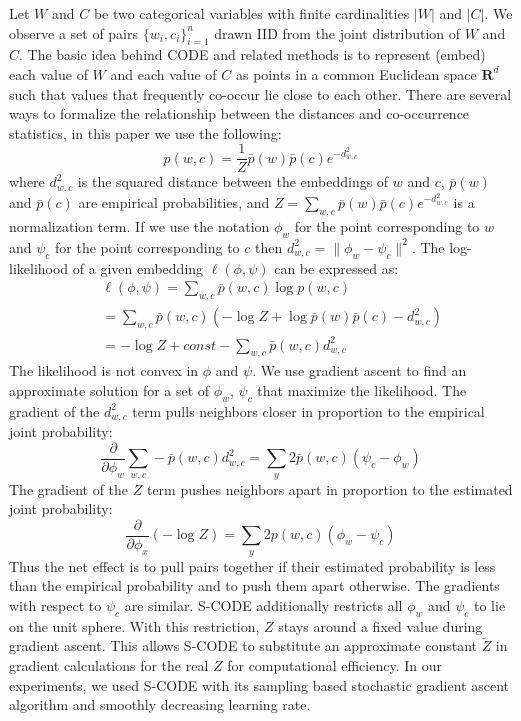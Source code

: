 Let $W$ and $C$ be two categorical variables with finite cardinalities
$|W|$ and $|C|$.  We observe a set of pairs $\{w_i, c_i\}_{i=1}^n$
drawn IID from the joint distribution of $W$ and $C$.  The basic idea
behind CODE and related methods is to represent (embed) each value of
$W$ and each value of $C$ as points in a common Euclidean space
$\mathbf{R}^d$ such that values that frequently co-occur lie close to
each other.  There are several ways to formalize the relationship
between the distances and co-occurrence statistics, in this paper we
use the following:
\begin{equation} \label{eq:probability}
p(w,c) = \frac{1}{Z} \bar{p}(w) \bar{p}(c) e^{-d^2_{w,c}}
\end{equation}
\noindent where $d^2_{w,c}$ is the squared distance between the
embeddings of $w$ and $c$, $\bar{p}(w)$ and $\bar{p}(c)$ are empirical
probabilities, and $Z=\sum_{w,c} \bar{p}(w) \bar{p}(c) e^{-d^2_{w,c}}$
is a normalization term.  If we use the notation $\phi_w$ for the
point corresponding to $w$ and $\psi_c$ for the point corresponding to
$c$ then $d^2_{w,c} = \|\phi_w-\psi_c\|^2$.  The log-likelihood of a
given embedding $\ell(\phi, \psi)$ can be expressed as:
\begin{eqnarray}
&&\ell(\phi, \psi) = \sum_{w,c} \bar{p}(w,c) \log p(w,c) \label{eq:likelihood} \\
&&= \sum_{w,c} \bar{p}(w,c) (-\log Z + \log \bar{p}(w)\bar{p}(c) - d^2_{w,c}) \nonumber \\
&&= -\log Z + \mathit{const} - \sum_{w,c} \bar{p}(w,c) d^2_{w,c} \nonumber
\end{eqnarray}
The likelihood is not convex in $\phi$ and $\psi$.  We use gradient
ascent to find an approximate solution for a set of $\phi_w$, $\psi_c$
that maximize the likelihood.  The gradient of the $d^2_{w,c}$ term
pulls neighbors closer in proportion to the empirical joint
probability:
\begin{equation}
\frac{\partial}{\partial\phi_w} \sum_{w,c} -\bar{p}(w,c) d^2_{w,c} =
\sum_y 2 \bar{p}(w,c) (\psi_c - \phi_w) \label{eq:attract}
\end{equation}
The gradient of the $Z$ term pushes neighbors apart in proportion to the
estimated joint probability:
\begin{equation}
\frac{\partial}{\partial\phi_x} (-\log Z) = \sum_y 2 p(w,c) (\phi_w -
\psi_c) \label{eq:repulse}
\end{equation}
Thus the net effect is to pull pairs together if their estimated
probability is less than the empirical probability and to push them
apart otherwise.  The gradients with respect to $\psi_c$ are similar.
S-CODE \cite{maron2010sphere} additionally restricts all $\phi_w$ and
$\psi_c$ to lie on the unit sphere.  With this restriction, $Z$ stays
around a fixed value during gradient ascent.  This allows S-CODE to
substitute an approximate constant $\tilde{Z}$ in gradient
calculations for the real $Z$ for computational efficiency.  In our
experiments, we used S-CODE with its sampling based stochastic
gradient ascent algorithm and smoothly decreasing learning rate.

